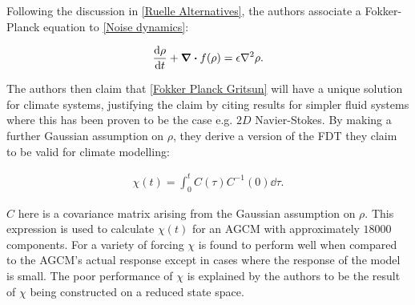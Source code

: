 \noindent Following the discussion in \ref{Ruelle Alternatives}, the authors associate a Fokker-Planck equation \cite{Risken1996} to \ref{Noise dynamics}:

\begin{align}
\dv{\rho}{t} + \div{f(\rho)} = \epsilon \laplacian \rho. \label{Fokker Planck Gritsun}
\end{align}

\noindent The authors then claim that \ref{Fokker Planck Gritsun} will have a unique solution for climate systems, justifying the claim by citing results for simpler fluid systems where this has been proven to be the case e.g. $2D$ Navier-Stokes. By making a further Gaussian assumption on $\rho$, they derive a version of the FDT they claim to be valid for climate modelling:

\begin{align}
\chi(t) = \int_0 ^t C(\tau)C^{-1}(0) \dd \tau.
\end{align}

\noindent $C$ here is a covariance matrix arising from the Gaussian assumption on $\rho$. This expression is used to calculate $\chi(t)$ for an AGCM with approximately $18000$ components. For a variety of forcing $\chi$ is found to perform well when compared to the AGCM's actual response except in cases where the response of the model is small. The poor performance of $\chi$ is explained by the authors to be the result of $\chi$ being constructed on a reduced state space.


